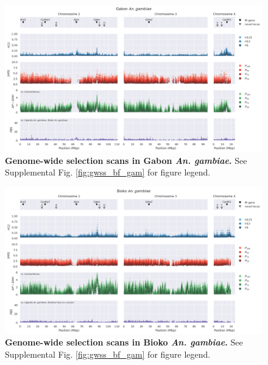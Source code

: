 \documentclass[a4paper,11pt,abstracton,hidelinks]{scrartcl}
\begin{document}
\begin{landscape}
\begin{figure}[t!]
	\begin{center}
		\includegraphics*[width=1.05\linewidth,center]{artwork/gwss_ga_gam_gw_ug_gam_gq_gam.png}
	\end{center}
	\caption[Genome-wide selection scans in Gabon \textit{An. gambiae}]{
	\textbf{Genome-wide selection scans in Gabon \textit{An. gambiae}.} 
	See Supplemental Fig. \ref{fig:gwss_bf_gam} for figure legend.
	} 
	\label{fig:gwss_ga_gam}
\end{figure}


\begin{figure}[t!]
	\begin{center}
		\includegraphics*[width=1.05\linewidth,center]{artwork/gwss_gq_gam_gw_ug_gam_bf_col.png}
	\end{center}
	\caption[Genome-wide selection scans in Bioko \textit{An. gambiae}]{
	\textbf{Genome-wide selection scans in Bioko \textit{An. gambiae}.} 
	See Supplemental Fig. \ref{fig:gwss_bf_gam} for figure legend.
	} 
	\label{fig:gwss_gq_gam}
\end{figure}



\end{landscape}
\end{document}
